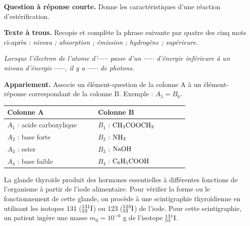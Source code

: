 \documentclass[11pt]{article}
\begin{document}



\noindent\textbf{Question à réponse courte.} Donne les caractéristiques d'une réaction d'estérification.

\medskip
\noindent\textbf{Texte à trous.} Recopie et complète la phrase suivante par quatre des cinq mots ci-après : \textit{niveau ; absorption ; émission ; hydrogène ; supérieure}.

\textit{Lorsque l'électron de l'atome d'$\cdots\cdots$ passe d'un $\cdots\cdots$ d'énergie inférieure à un niveau d'énergie $\cdots\cdots$, il y a $\cdots\cdots$ de photons.}

\medskip
\noindent\textbf{Appariement.} Associe un élément-question de la colonne A à un élément-réponse correspondant de la colonne B. Exemple : $A_5 = B_6$.

\begin{center}\renewcommand{\arraystretch}{1.5}
\begin{tabular}{|p{0.42\linewidth}|p{0.42\linewidth}|}
\hline
\textbf{Colonne A} & \textbf{Colonne B} \\
\hline
$A_1$ : acide carboxylique & $B_1$ : $\mathrm{CH_3COOCH_3}$ \\
\hline
$A_2$ : base forte & $B_2$ : $\mathrm{NH_3}$ \\
\hline
$A_3$ : ester & $B_3$ : $\mathrm{NaOH}$ \\
\hline
$A_4$ : base faible & $B_4$ : $\mathrm{C_6H_5COOH}$ \\
\hline
\end{tabular}
\end{center}

La glande thyroïde produit des hormones essentielles à différentes fonctions de l'organisme à partir de l'iode alimentaire. Pour vérifier la forme ou le fonctionnement de cette glande, on procède à une scintigraphie thyroïdienne en utilisant les isotopes 131 ($\mathrm{^{131}_{53}I}$) ou 123 ($\mathrm{^{123}_{53}I}$) de l'iode. Pour cette scintigraphie, un patient ingère une masse $m_0 = 10^{-6}$ g de l'isotope $\mathrm{^{131}_{53}I}$.
\end{document}
